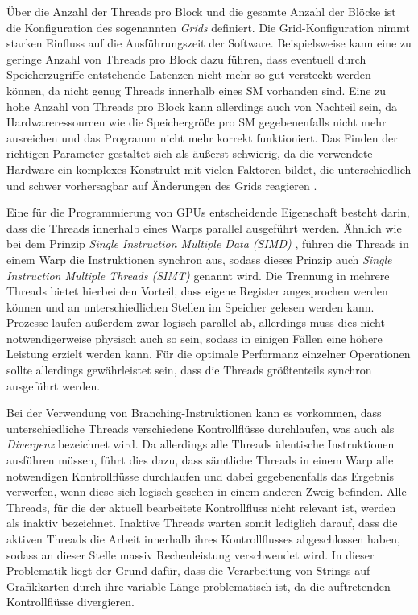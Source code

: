 Über die Anzahl der Threads pro Block und die gesamte Anzahl der Blöcke ist die Konfiguration des sogenannten \emph{Grids} definiert.
Die Grid-Konfiguration nimmt starken Einfluss auf die Ausführungszeit der Software.
Beispielsweise kann eine zu geringe Anzahl von Threads pro Block dazu führen, dass eventuell durch Speicherzugriffe entstehende Latenzen nicht mehr so gut versteckt werden können, da nicht genug Threads innerhalb eines SM vorhanden sind.
Eine zu hohe Anzahl von Threads pro Block kann allerdings auch von Nachteil sein, da Hardwareressourcen wie die Speichergröße pro SM gegebenenfalls nicht mehr ausreichen und das Programm nicht mehr korrekt funktioniert.
Das Finden der richtigen Parameter gestaltet sich als äußerst schwierig, da die verwendete Hardware ein komplexes Konstrukt mit vielen Faktoren bildet, die unterschiedlich und schwer vorhersagbar auf Änderungen des Grids reagieren \cite{Wong2010}.

Eine für die Programmierung von GPUs entscheidende Eigenschaft besteht darin, dass die Threads innerhalb eines Warps parallel ausgeführt werden.
Ähnlich wie bei dem Prinzip \emph{Single Instruction Multiple Data (SIMD)} \cite{Pohl2016}, führen die Threads in einem Warp die Instruktionen synchron aus, sodass dieses Prinzip auch \emph{Single Instruction Multiple Threads (SIMT)} genannt wird.
Die Trennung in mehrere Threads bietet hierbei den Vorteil, dass eigene Register angesprochen werden können und an unterschiedlichen Stellen im Speicher gelesen werden kann.
Prozesse laufen außerdem zwar logisch parallel ab, allerdings muss dies nicht notwendigerweise physisch auch so sein, sodass in einigen Fällen eine höhere Leistung erzielt werden kann.
Für die optimale Performanz einzelner Operationen sollte allerdings gewährleistet sein, dass die Threads größtenteils synchron ausgeführt werden.

Bei der Verwendung von Branching-Instruktionen kann es vorkommen, dass unterschiedliche Threads verschiedene Kontrollflüsse durchlaufen, was auch als \emph{Divergenz} bezeichnet wird.
Da allerdings alle Threads identische Instruktionen ausführen müssen, führt dies dazu, dass sämtliche Threads in einem Warp alle notwendigen Kontrollflüsse durchlaufen und dabei gegebenenfalls das Ergebnis verwerfen, wenn diese sich logisch gesehen in einem anderen Zweig befinden.
Alle Threads, für die der aktuell bearbeitete Kontrollfluss nicht relevant ist, werden als inaktiv bezeichnet.
Inaktive Threads warten somit lediglich darauf, dass die aktiven Threads die Arbeit innerhalb ihres Kontrollflusses abgeschlossen haben, sodass an dieser Stelle massiv Rechenleistung verschwendet wird.
In dieser Problematik liegt der Grund dafür, dass die Verarbeitung von Strings auf Grafikkarten durch ihre variable Länge problematisch ist, da die auftretenden Kontrollflüsse divergieren.

